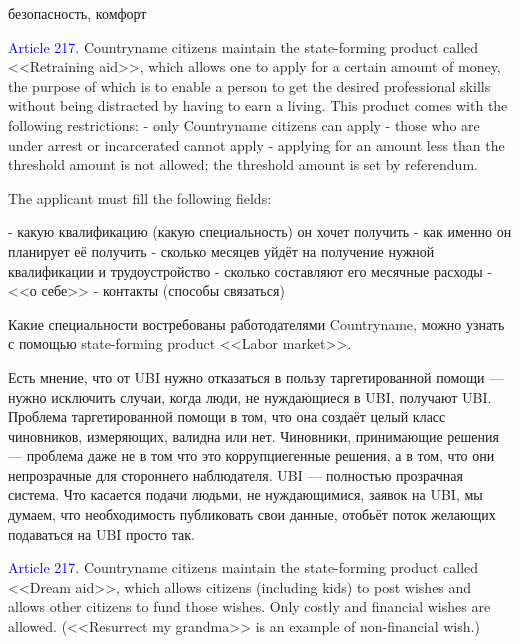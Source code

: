 \documentclass[11pt]{article}
\theoremstyle{remark}
\theoremstyle{definition}
\begin{document}
безопасность, комфорт

\color{black}






\textcolor{blue}{Article 217.} Countryname citizens maintain the state-forming product called <<Retraining aid>>, which allows one to apply for a certain amount of money, the purpose of which is to enable a person to get the desired professional skills without being distracted by having to earn a living. This product comes with the following restrictions:
- only Countryname citizens can apply
- those who are under arrest or incarcerated cannot apply
- applying for an amount less than the threshold amount is not allowed; the threshold amount is set by referendum.


The applicant must fill the following fields:

- какую квалификацию (какую специальность) он хочет получить
- как именно он планирует её получить
- сколько месяцев уйдёт на получение нужной квалификации и трудоустройство
- сколько составляют его месячные расходы
- <<о себе>>
- контакты (способы связаться)



\color{blue}



Какие специальности востребованы работодателями Countryname, можно узнать с помощью state-forming product <<Labor market>>. 

Есть мнение, что от UBI нужно отказаться в пользу таргетированной помощи --- нужно исключить случаи, когда люди, не нуждающиеся в UBI, получают UBI. Проблема таргетированной помощи в том, что она создаёт целый класс чиновников, измеряющих, валидна или нет. Чиновники, принимающие решения --- проблема даже не в том что это коррупциегенные решения, а в том, что они непрозрачные для стороннего наблюдателя. UBI --- полностью прозрачная система. Что касается подачи людьми, не нуждающимися, заявок на UBI, мы думаем, что необходимость публиковать свои данные, отобьёт поток желающих подаваться на UBI просто так.


\color{black}

\textcolor{blue}{Article 217.} Countryname citizens maintain the state-forming product called <<Dream aid>>, which allows citizens (including kids) to post wishes and allows other citizens to fund those wishes. Only costly and financial wishes are allowed. (<<Resurrect my grandma>> is an example of non-financial wish.)

\color{blue}
\end{document}
